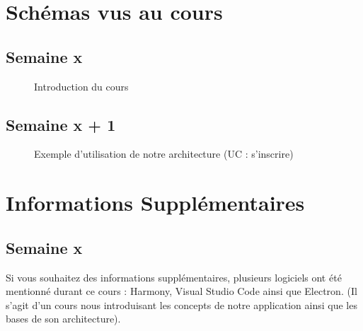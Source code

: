 \documentclass{article}[12pt]
\begin{document}


\tableofcontents%
\newpage
\section{Schémas vus au cours}
\subsection{Semaine x}
\begin{figure}[H]
    \centering
    \caption{Introduction du cours}
\end{figure}
\subsection{Semaine x + 1}
\begin{figure}[H]
    \centering
    \caption{Exemple d'utilisation de notre architecture (UC : s'inscrire)}
\end{figure}

\section{Informations Supplémentaires}
\subsection{Semaine x}
Si vous souhaitez des informations supplémentaires, plusieurs logiciels ont été mentionné durant ce cours : Harmony, Visual Studio Code ainsi que Electron. (Il s'agit d'un cours nous introduisant les concepts de notre application ainsi que les bases de son architecture).
\end{document}
